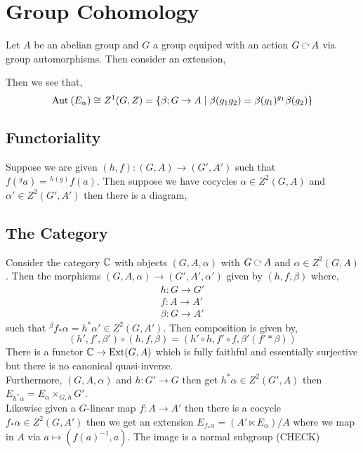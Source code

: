 \documentclass[12pt]{article}
\begin{document}
\section{Group Cohomology}

Let $A$ be an abelian group and $G$ a group equiped with an action $G \acts A$ via group automorphisms. Then consider an extension,
\begin{center}
\end{center}
Then we see that,
\[ \mathrm{Aut}_{} \left( E_\alpha \right) \cong Z^1(G, Z) = \{ \beta ; G \to A \mid \beta(g_1 g_2) = \beta(g_1) {}^{g_1} \beta(g_2) \} \]

\subsection{Functoriality}

Suppose we are given $(h,f) : (G, A) \to (G', A')$ such that $f({}^g a) = {}^{h(g)} f(a)$. Then suppose we have cocycles $\alpha \in Z^2(G, A)$ and $\alpha' \in Z^2(G', A')$ then there is a diagram,
\begin{center}
\end{center}


\subsection{The Category}

Consider the category $\mathbb{C}$ with objects $(G, A, \alpha)$ with $G \acts A$ and $\alpha \in Z^2(G, A)$. Then the morphisms $(G, A, \alpha) \to (G', A', \alpha')$ given by $(h, f, \beta)$ where,
\begin{align*}
h : G \to G'
\\
f : A \to A'
\\
\beta : G \to A' 
\end{align*}
such that ${}^\beta f_* \alpha = h^* \alpha' \in Z^2(G, A')$. Then composition is given by,
\[ (h', f', \beta') \circ (h, f, \beta) = (h' \circ h, f' \circ f, \beta'(f' * \beta)) \]
There is a functor $\mathbb{C} \to \mathrm{Ext}(G, A)$ which is fully faithful and essentially surjective but there is no canonical quasi-inverse. 
\bigskip\\
Furthermore, $(G, A, \alpha)$ and $h : G' \to G$ then get $h^* \alpha \in Z^2(G', A)$ then $E_{h^* \alpha} = E_{\alpha} \times_{G, h} G'$.
\bigskip\\
Likewise given a $G$-linear map $f : A \to A'$ then there is a cocycle $f_* \alpha \in Z^2(G, A')$ then we get an extension $E_{f_* \alpha} = (A' \ltimes E_\alpha)/A$ where we map in $A$ via $a \mapsto (f(a)^{-1}, a)$. The image is a normal subgroup (CHECK)
\end{document}
